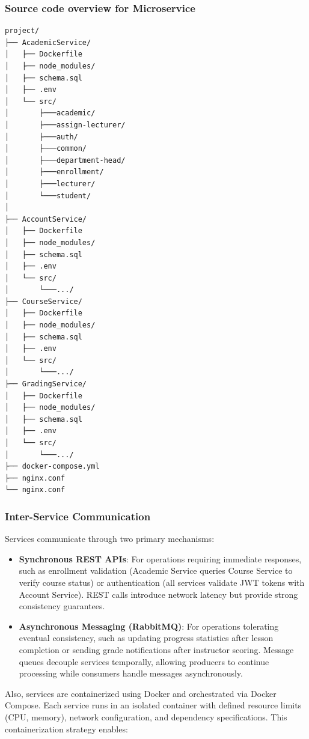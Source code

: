 \subsubsection{Source code overview for Microservice} %

\begin{verbatim}
project/
├── AcademicService/
│   ├── Dockerfile
│   ├── node_modules/
│   ├── schema.sql
│   ├── .env
│   └── src/
│       ├───academic/
│       ├───assign-lecturer/
│       ├───auth/
│       ├───common/
│       ├───department-head/
│       ├───enrollment/
│       ├───lecturer/
│       └───student/
│ 
├── AccountService/
│   ├── Dockerfile
│   ├── node_modules/
│   ├── schema.sql
│   ├── .env
│   └── src/
│       └───.../
├── CourseService/
│   ├── Dockerfile
│   ├── node_modules/
│   ├── schema.sql
│   ├── .env
│   └── src/
│       └───.../
├── GradingService/
│   ├── Dockerfile
│   ├── node_modules/
│   ├── schema.sql
│   ├── .env
│   └── src/
│       └───.../
├── docker-compose.yml
├── nginx.conf
└── nginx.conf
\end{verbatim}

\subsubsection{Inter-Service Communication}

Services communicate through two primary mechanisms:

\begin{itemize}
    \item \textbf{Synchronous REST APIs}: For operations requiring immediate responses, such as 
    enrollment validation (Academic Service queries Course Service to verify course status) or 
    authentication (all services validate JWT tokens with Account Service). REST calls introduce 
    network latency but provide strong consistency guarantees.
    
    \item \textbf{Asynchronous Messaging (RabbitMQ)}: For operations tolerating eventual consistency, 
    such as updating progress statistics after lesson completion or sending grade notifications after 
    instructor scoring. Message queues decouple services temporally, allowing producers to continue 
    processing while consumers handle messages asynchronously.
\end{itemize}

Also, services are containerized using Docker and orchestrated via Docker Compose. Each service 
runs in an isolated container with defined resource limits (CPU, memory), network configuration, 
and dependency specifications. This containerization strategy enables:

